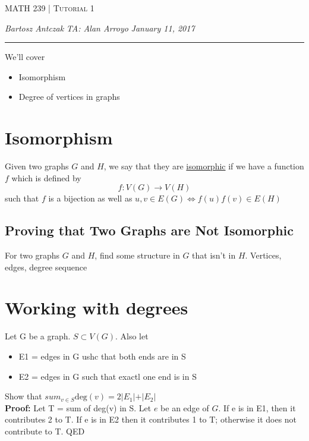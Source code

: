 \documentclass{report}
\newcommand{\tutorialNum}{1}
\newcommand{\curDate}{January 11, 2017}
\newcommand{\course}{MATH 239}
\newcommand{\instructor}{Alan Arroyo}
\begin{document}
\begin{center}
\begin{Large}
\textsc{\course{} | Tutorial \tutorialNum{}}
\end{Large}
\end{center} 
\noindent \textit{Bartosz Antczak} \hfill
\textit{TA: \instructor{}} \hfill
\textit{\curDate{}}
\rule{\textwidth}{0.4pt}

\noindent We'll cover
\begin{itemize}
\item Isomorphism
\item Degree of vertices in graphs
\end{itemize}
\section{Isomorphism}
Given two graphs $G$ and $H$, we say that they are \underline{isomorphic} if we have a function $f$ which is defined by
$$f: V(G) \rightarrow V(H)$$
such that $f$ is a bijection as well as $u,v \in E(G) \iff f(u)f(v)\in E(H)$
\subsection{Proving that Two Graphs are Not Isomorphic}
For two graphs $G$ and $H$, find some structure in $G$ that isn't in $H$. Vertices, edges, degree sequence
\section{Working with degrees}
Let G be a graph. $S \subset V(G)$. Also let
\begin{itemize}
\item E1 = edges in G ushc that both ends are in S
\item E2 = edges in G such that exactl one end is in S
\end{itemize}
Show that $sum_{v\in S} \mathrm{deg}(v) = 2 \vert E_1 \vert + \vert E_2 \vert$\\\textbf{Proof:} Let T = sum of deg(v) in S. Let $e$ be an edge of $G$. If e is in E1, then it contributes 2 to T. If e is in E2 then it contributes 1 to T; otherwise it does not contribute to T. QED
\end{document}
